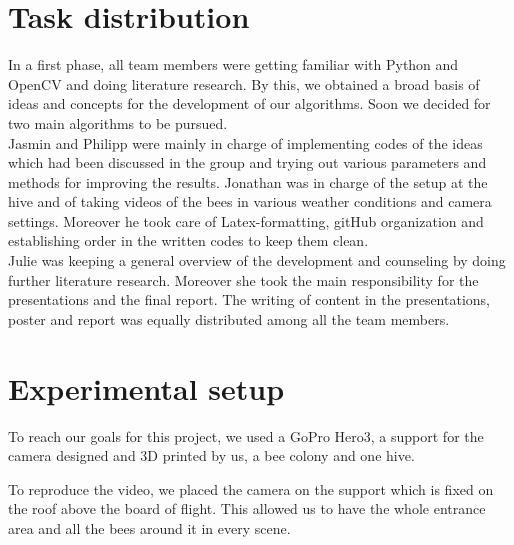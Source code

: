 \documentclass[10pt,twocolumn,letterpaper]{article}
\begin{document}
\section{Task distribution}
In a first phase, all team members were getting familiar with Python and OpenCV and doing literature research. By this, we obtained a broad basis of ideas and concepts for the development of our algorithms. Soon we decided for two main algorithms to be pursued. \\
Jasmin and Philipp were mainly in charge of implementing codes of the ideas which had been discussed in the group and trying out various parameters and methods for improving the results.
Jonathan was in charge of the setup at the hive and of taking videos of the bees in various weather conditions and camera settings. Moreover he took care of Latex-formatting, gitHub organization and establishing order in the written codes to keep them clean. \\
Julie was keeping a general overview of the development and counseling by doing further literature research. Moreover she took the main responsibility for the presentations and the final report. 
The writing of content in the presentations, poster and report was equally distributed among all the team members.


\section{Experimental setup}

To reach our goals for this project, we used a GoPro Hero3, a support for the camera designed and 3D printed by us, a bee colony and one hive.

To reproduce the video, we placed the camera on the support which is fixed on the roof above the board of flight. This allowed us to have the whole entrance area and all the bees around it in every scene.
\end{document}
